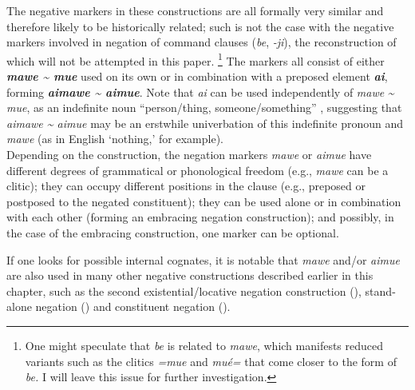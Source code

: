 \documentclass[output=paper,draft,draftmode,colorlinks,citecolor=brown]{langscibook}
\begin{document}
The negative markers in these constructions are all formally very similar
and therefore likely to be historically related; such is not the case with
the negative markers involved in negation of command clauses (\textit{be},
\textit{-ji}), the reconstruction of which will not be attempted in this
paper.%
%
    \footnote{One might speculate that \textit{be} is related to
    \textit{mawe}, which manifests reduced variants such as the clitics
    \textit{=mue} and \textit{mué=} that come closer to the form of
    \textit{be.} I will leave this issue for further investigation.} 
%
The markers all consist of either \textbf{\textit{mawe \textasciitilde{}
mue}} used on its own or in combination with a preposed element
\textbf{\textit{ai}}, forming \textbf{\textit{aimawe {\textasciitilde}
aimue}}. Note that \textit{ai} can be used independently of \textit{mawe}
\textit{{\textasciitilde} mue}, as an indefinite noun ``person\slash thing,
someone\slash something'' , suggesting that
\textit{aimawe {\textasciitilde} aimue} may be an erstwhile univerbation of
this indefinite pronoun and \textit{mawe} (as in English `nothing,'
for example).
%
\\ 
Depending on the construction, the negation markers \textit{mawe} or
\textit{aimue} have different degrees of grammatical or phonological
freedom (e.g., \textit{mawe} can be a clitic); they can occupy different
positions in the clause (e.g., preposed or postposed to the negated constituent); they can be used alone or in combination with each other (forming an embracing negation construction); and possibly, in the case of the embracing construction, one marker can be optional.

If one looks for possible internal cognates, it is notable that
\textit{mawe} and\slash or \textit{aimue} are also used in many other
negative constructions described earlier in this chapter, such as the
second existential\slash locative negation construction
(), stand-alone negation () and
constituent negation ().
\end{document}
